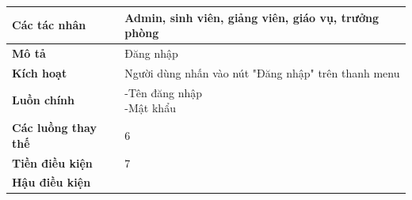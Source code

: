   \begin{table}
    \begin{tabular}{|l|l|}
      \hline
      \textbf{Các tác nhân} & Admin, sinh viên, giảng viên, giáo vụ, trưởng phòng \\
      \hline
      \textbf{Mô tả} & Đăng nhập\\
      \hline
      \textbf{Kích hoạt} & Người dùng nhấn vào nút "Đăng nhập" trên thanh menu \\
      \hline 
      \textbf{Luồn chính} & \makecell[l]{-Tên đăng nhập \\ -Mật khẩu} \\
      \hline
      \textbf{Các luồng thay thế} & 6 \\
      \hline
      \textbf{Tiền điều kiện} & 7 \\
      \hline
      \textbf{Hậu điều kiện} & \\
      \hline
    \end{tabular}
  \end{table}